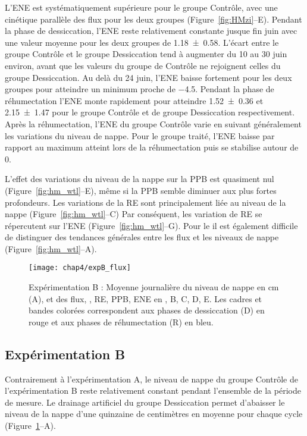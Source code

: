 L'ENE est systématiquement supérieure pour le groupe Contrôle, avec une cinétique parallèle des flux pour les deux groupes (Figure~\ref{fig:HMzi}--E).
Pendant la phase de dessiccation, l'ENE reste relativement constante jusque fin juin avec une valeur moyenne pour les deux groupes de \SI{1.18(058)}{\uml}.
L'écart entre le groupe Contrôle et le groupe Dessiccation tend à augmenter du 10 au 30 juin environ, avant que les valeurs du groupe de Contrôle ne rejoignent celles du groupe Dessiccation.
Au delà du 24 juin, l'ENE baisse fortement pour les deux groupes pour atteindre un minimum proche de \SI{-4.5}{\uml}.
Pendant la phase de réhumectation l'ENE monte rapidement pour atteindre \num{1.52(036)} et \SI{2.15(147)}{\uml} pour le groupe Contrôle et de groupe Dessiccation respectivement.
Après la réhumectation, l'ENE du groupe Contrôle varie en suivant généralement les variations du niveau de nappe.
Pour le groupe traité, l'ENE baisse par rapport au maximum atteint lors de la réhumectation puis se stabilise autour de 0.

L'effet des variations du niveau de la nappe sur la PPB est quasiment nul (Figure~\ref{fig:hm_wtl}--E), même si la PPB semble diminuer aux plus fortes profondeurs.
Les variations de la RE sont principalement liée au niveau de la nappe (Figure~\ref{fig:hm_wtl}--C) Par conséquent, les variation de RE se répercutent sur l'ENE (Figure~\ref{fig:hm_wtl}--G).
Pour le \chh il est également difficile de distinguer des tendances générales entre les flux et les niveaux de nappe (Figure~\ref{fig:hm_wtl}--A).

\begin{figure}
\centering
\texttt{[image: chap4/expB\_flux]}
\caption{Expérimentation B : Moyenne journalière du niveau de nappe en cm (A), et des flux, \chh, RE, PPB, ENE en \si{\uml}, B, C, D, E. Les cadres et bandes colorées correspondent aux phases de dessiccation (D) en rouge et aux phases de réhumectation (R) en bleu.}
\label{fig:HMty}
\end{figure}

\subsection{Expérimentation B}

Contrairement à l'expérimentation A, le niveau de nappe du groupe Contrôle de l'expérimentation B reste relativement constant pendant l'ensemble de la période de mesure.
Le drainage artificiel du groupe Dessiccation permet d'abaisser le niveau de la nappe d'une quinzaine de centimètres en moyenne pour chaque cycle (Figure~\ref{fig:HMty}--A).


